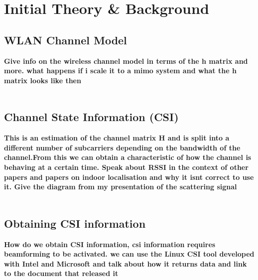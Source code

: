 \section{Initial Theory \& Background}
\subsection{WLAN Channel Model}
\textbf{Give info on the wireless channel model in terms of the h matrix and more. what happens if i scale it to a mimo system and what the h matrix looks like then} \\\\





\subsection{Channel State Information (CSI)}
\textbf{This is an estimation of the channel matrix H and is split into a different number of subcarriers depending on the bandwidth of the channel.From this we can obtain a characteristic of how the channel is behaving at a certain time. Speak about RSSI in the context of other papers and papers on indoor localisation and why it isnt correct to use it. Give the diagram from my presentation of the scattering signal} \\\\






\subsection{Obtaining CSI information}
\textbf{How do we obtain CSI information, csi information requires beamforming to be activated. we can use the Linux CSI tool developed with Intel and Microsoft and talk about how it returns data and link to the document that released it} \\\\




